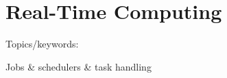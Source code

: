 \chapter{Real-Time Computing} \label{ch:realTimeComputing}

Topics/keywords:

Jobs \& schedulers \& task handling











